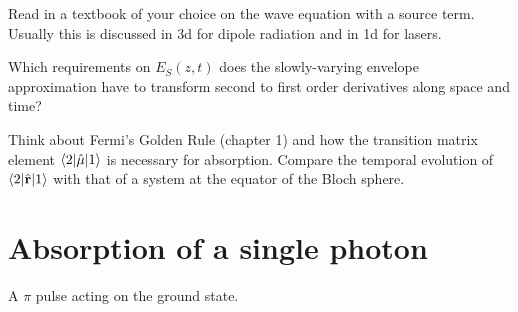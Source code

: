 \begin{questions}

\item Read in a  textbook of your choice on the wave equation with a source term. Usually this is discussed in 3d for dipole radiation and in 1d for lasers.

\item Which requirements on  $E_S(z,t) $ does the slowly-varying envelope approximation have to transform second to first order derivatives along space and time?

\item Think about Fermi's Golden Rule (chapter 1) and how the transition matrix element $\braket{2|\hat{\mu}|1}$ is necessary for absorption. Compare the temporal evolution of $\braket{2|\hat{\mathbf{r}}|1}$ with that of a system at the equator of the Bloch sphere.
\end{questions}



\section{Absorption of a single photon}

\begin{marginfigure}
\hspace*{\fill} 


\caption{A $\pi$ pulse acting on the ground state.}
\end{marginfigure}


